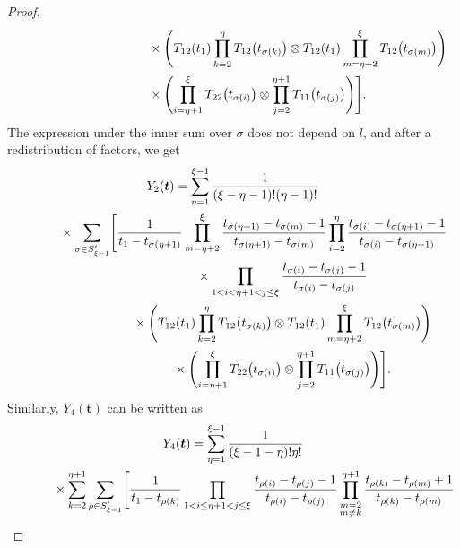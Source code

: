 \documentclass[pdftex]{sigma}
\numberwithin{equation}{section}
\begin{document}
\begin{proof}
\begin{gather*}
\begin{split}
&\hphantom{Y_2(\boldsymbol{t})=\times\sum_{l=\eta+1}^\xi \sum_{\sigma\in S_{\xi-1}'} \Biggl[}{}
\times\Biggl( T_{12} (t_1)\prod_{k=2}^{\eta} T_{12} \bigl(t_{\sigma(k)}\bigr) \otimes T_{12}(t_1) \prod_{m=\eta+2}^\xi T_{12} \bigl(t_{\sigma(m)}\bigr)\Biggr)\\
&\hphantom{Y_2(\boldsymbol{t})=\times\sum_{l=\eta+1}^\xi \sum_{\sigma\in S_{\xi-1}'} \Biggl[}{}
 \times\Biggl( \prod_{i=\eta+1}^{\xi } T _{22}\bigl(t_{\sigma(i)}\bigr)\otimes \prod_{j=2}^{\eta+1} T _{11}\bigl(t_{\sigma(j)}\bigr)\Biggr) \Biggr].
 \end{split}
\end{gather*}
The expression under the inner sum over $\sigma$ does not depend on $l$, and after a redistribution of factors, we get
\begin{gather}
Y_2(\boldsymbol{t})= \sum_{\eta=1}^{\xi-1} \frac{1}{(\xi-\eta-1) ! (\eta-1)!} \nonumber\\
\hphantom{Y_2(\boldsymbol{t})=}{}
\times \sum_{\sigma\in S_{\xi-1}'}\Biggl[ \frac{1}{t_1-t_{\sigma(\eta+1)}}\prod_{m=\eta+2}^\xi \frac{t_{\sigma(\eta+1)}-t_{\sigma(m)}-1}{t_{\sigma(\eta+1)}-t_{\sigma(m)}}\prod_{i=2}^\eta \frac{t_{\sigma(i)}-t_{\sigma(\eta+1)}-1}{t_{\sigma(i)}-t_{\sigma(\eta+1)}} \nonumber\\
\hphantom{Y_2(\boldsymbol{t})=\times \sum_{\sigma\in S_{\xi-1}'}\Biggl[}{}
\times\prod_{1< i<\eta+1<j \leq \xi} \frac{t_{\sigma(i)}-t_{\sigma(j)}-1}{t_{\sigma(i)}-t_{\sigma(j)}}\nonumber\\
\hphantom{Y_2(\boldsymbol{t})=\times \sum_{\sigma\in S_{\xi-1}'}\Biggl[}{}
\times \Biggl( T_{12} (t_1)\prod_{k=2}^{\eta} T_{12} \bigl(t_{\sigma(k)}\bigr) \otimes T_{12}(t_1) \prod_{m=\eta+2}^\xi T_{12} \bigl(t_{\sigma(m)}\bigr)\Biggr) \nonumber\\
\hphantom{Y_2(\boldsymbol{t})=\times\sum_{\sigma\in S_{\xi-1}'}\Biggl[}{}
\times\Biggl( \prod_{i=\eta+1}^{\xi } T _{22}\bigl(t_{\sigma(i)}\bigr)\otimes \prod_{j=2}^{\eta+1} T _{11}\bigl(t_{\sigma(j)}\bigr)\Biggr) \Biggr].\label{final2}
\end{gather}
Similarly, $Y_4(\boldsymbol{t})$ can be written as
\begin{gather*}
Y_4(\boldsymbol{t})= \sum_{\eta=1}^{\xi-1} \frac{1}{(\xi-1-\eta) ! \eta!} \\
\hphantom{Y_4(\boldsymbol{t})= }{}
\times\sum_{k=2}^{\eta+1} \sum_{\rho\in S_{\xi-1}'} \Biggl[ \frac{1}{t_1-t_{\rho(k)}} \prod_{1< i\leq\eta+1<j \leq \xi} \frac{t_{\rho(i)}-t_{\rho(j)}-1}{t_{\rho(i)}-t_{\rho(j)}} \prod_{\substack{m=2\\m\neq k}}^{\eta+1} \frac{t_{\rho(k)}-t_{\rho(m)}+1}{t_{\rho(k)}-t_{\rho(m)}} \\

\end{gather*}
\end{proof}
\end{document}
